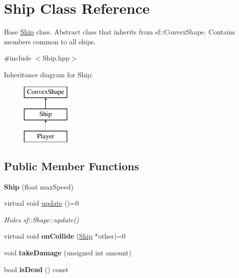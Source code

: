 \hypertarget{class_ship}{}\section{Ship Class Reference}
\label{class_ship}


Base \hyperlink{class_ship}{Ship} class. Abstract class that inherits from sf\+::\+Convex\+Shape. Contains members common to all ships.  




{\ttfamily \#include $<$Ship.\+hpp$>$}

Inheritance diagram for Ship\+:\begin{figure}[H]
\begin{center}
\leavevmode
\includegraphics[height=3.000000cm]{class_ship}
\end{center}
\end{figure}
\subsection*{Public Member Functions}
\begin{DoxyCompactItemize}
\item 
\hypertarget{class_ship_a4361703fa6d49a17f080648e1c2dc60b}{}{\bfseries Ship} (float max\+Speed)\label{class_ship_a4361703fa6d49a17f080648e1c2dc60b}

\item 
\hypertarget{class_ship_abfe8b92e7f0346b198e8c40cff44ebeb}{}virtual void \hyperlink{class_ship_abfe8b92e7f0346b198e8c40cff44ebeb}{update} ()=0\label{class_ship_abfe8b92e7f0346b198e8c40cff44ebeb}

\begin{DoxyCompactList}\small\item\em Hides sf\+::\+Shape\+::update() \end{DoxyCompactList}\item 
\hypertarget{class_ship_a966830e20a179ada7d4b7301577b72d7}{}virtual void {\bfseries on\+Collide} (\hyperlink{class_ship}{Ship} $\ast$other)=0\label{class_ship_a966830e20a179ada7d4b7301577b72d7}

\item 
\hypertarget{class_ship_a3a0732b4bb4697b57398cec3b24d76ed}{}void {\bfseries take\+Damage} (unsigned int amount)\label{class_ship_a3a0732b4bb4697b57398cec3b24d76ed}

\item 
\hypertarget{class_ship_a52d219bbadbba6475b919f8e6497ce34}{}bool {\bfseries is\+Dead} () const \label{class_ship_a52d219bbadbba6475b919f8e6497ce34}

\end{DoxyCompactItemize}
